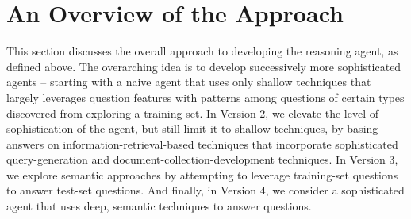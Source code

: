 
%

\section{An Overview of the Approach}

This section discusses the overall approach to developing the reasoning agent, as defined above.  The overarching idea is to develop successively more sophisticated agents -- starting with a naive agent that uses only shallow techniques that largely leverages question features with patterns among questions of certain types discovered from exploring a training set.  In Version 2, we elevate the level of sophistication of the agent, but still limit it to shallow techniques, by basing answers on information-retrieval-based techniques that incorporate sophisticated query-generation and document-collection-development techniques.  In Version 3, we explore semantic approaches by attempting to leverage training-set questions to answer test-set questions.  And finally, in Version 4, we consider a sophisticated agent that uses deep, semantic techniques to answer questions.



